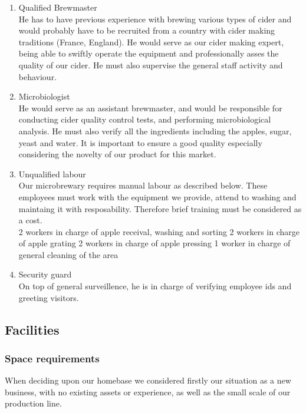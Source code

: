 \documentclass[11pt]{article}
\begin{document}
  \begin{enumerate}
  \item Qualified Brewmaster \\
He has to have previous experience with brewing various types of cider and would probably have to be recruited from a country with cider making traditions (France, England). He would serve as our cider making expert, being able to swiftly operate the equipment and professionally asses the quality of our cider. He must also supervise the general staff activity and behaviour.

  \item Microbiologist \\
He would serve as an assistant brewmaster, and would be responsible for conducting cider quality control tests, and performing microbiological analysis. He must also verify all the ingredients including the apples, sugar, yeast and water.
It is important to ensure a good quality especially considering the novelty of our product for this market.

  \item Unqualified labour \\
Our microbrewary requires manual labour as described below. These employees must work with the equipment we provide, attend to washing and maintaing it with resposability. Therefore brief training must be considered as a cost. \\ 
  2 workers in charge of apple receival, washing and sorting
  2 workers in charge of apple grating
  2 workers in charge of apple pressing
  1 worker in charge of general cleaning of the area

  \item Security guard \\
On top of general surveillence, he is in charge of verifying employee ids and greeting visitors.
  \end{enumerate}


 
  \subsection{Facilities}
    \subsubsection{Space requirements}
When deciding upon our homebase we considered firstly our situation as a new business, with no existing assets or experience, as well as the small scale of our production line. \\
\end{document}
